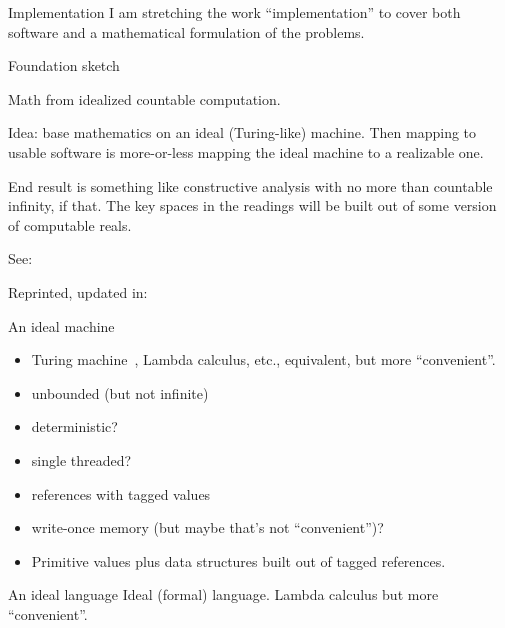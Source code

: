\documentclass[11pt]{PalisadesLakesBook}
\begin{document}
\begin{plSection}{Implementation}
I am stretching the work ``implementation'' to cover both
software and a mathematical formulation of the problems.
\begin{plSection}{Foundation sketch}

Math from idealized countable computation.

Idea: base mathematics on an ideal (Turing-like) machine.
Then mapping to usable software is more-or-less mapping
the ideal machine to a realizable one.

End result is something like constructive analysis
with no more than countable infinity, if that.
The key spaces in the readings will be built out of 
some version of computable reals.

See:



Reprinted, updated in:




\begin{plSection}{An ideal machine}
\begin{itemize}
  \item Turing machine~\cite{
  Turing:1936:Computability,
  Turing:1937:ComputabilityLambda,
  Turing:1938:ComputabilityCorrection},
  Lambda calculus, etc.,
  equivalent,
  but more ``convenient''.
  \item unbounded (but not infinite)
  \item deterministic?
  \item single threaded?
  \item references with tagged values
  \item write-once memory (but maybe that's not ``convenient'')?
  \item Primitive values plus data structures built out of tagged
  references.
\end{itemize}
\end{plSection}%
\begin{plSection}{An ideal language}
Ideal (formal) language. Lambda calculus but more ``convenient''.


\end{plSection}
\end{plSection}
\end{plSection}
\end{document}
